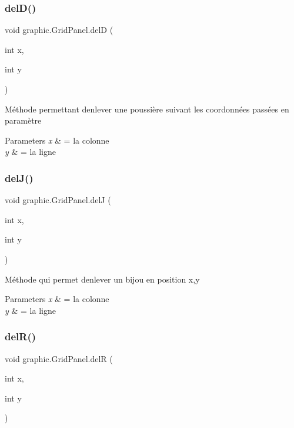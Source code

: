 \subsubsection{\texorpdfstring{del\+D()}{delD()}}
{\footnotesize\ttfamily void graphic.\+Grid\+Panel.\+delD (\begin{DoxyParamCaption}\item[{int}]{x,  }\item[{int}]{y }\end{DoxyParamCaption})}

Méthode permettant d\textquotesingle{}enlever une poussière suivant les coordonnées passées en paramètre 
\begin{DoxyParams}{Parameters}
{\em x} & = la colonne \\
\hline
{\em y} & = la ligne \\
\hline
\end{DoxyParams}
\hypertarget{classgraphic_1_1_grid_panel_add084a73d4c1597c56ee83c177c84ea8}{}\label{classgraphic_1_1_grid_panel_add084a73d4c1597c56ee83c177c84ea8} 
\subsubsection{\texorpdfstring{del\+J()}{delJ()}}
{\footnotesize\ttfamily void graphic.\+Grid\+Panel.\+delJ (\begin{DoxyParamCaption}\item[{int}]{x,  }\item[{int}]{y }\end{DoxyParamCaption})}

Méthode qui permet d\textquotesingle{}enlever un bijou en position x,y 
\begin{DoxyParams}{Parameters}
{\em x} & = la colonne \\
\hline
{\em y} & = la ligne \\
\hline
\end{DoxyParams}
\hypertarget{classgraphic_1_1_grid_panel_ad114a8a30536087a1dfa6c0df00cdc69}{}\label{classgraphic_1_1_grid_panel_ad114a8a30536087a1dfa6c0df00cdc69} 
\subsubsection{\texorpdfstring{del\+R()}{delR()}}
{\footnotesize\ttfamily void graphic.\+Grid\+Panel.\+delR (\begin{DoxyParamCaption}\item[{int}]{x,  }\item[{int}]{y }\end{DoxyParamCaption})}


